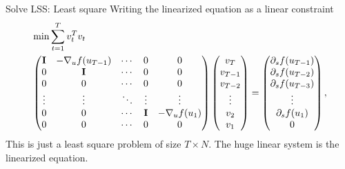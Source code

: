 \documentclass[NUS-Kajima workshop]{beamer}
\begin{document}
\begin{frame}{Solve LSS: Least square}
	Writing the linearized equation as a linear constraint
	\begin{equation}\label{equ:lss}
		\begin{aligned}
			& \min \sum_{t=1}^T v_t^T v_t \\
		&\begin{pmatrix}
			\mathbf{I} & -\nabla_u f(u_{T-1}) & \cdots & 0 & 0 \\
			0 & \mathbf{I} & \cdots & 0 & 0 \\
			0 & 0 & \cdots & 0 & 0 \\
			\vdots & \vdots & \ddots & \vdots & \vdots \\
			0 & 0 & \cdots & \mathbf{I} & -\nabla_u f(u_1)	\\
			0 & 0 & \cdots & 0 & 0
		\end{pmatrix}\begin{pmatrix}
			v_T \\ v_{T-1} \\ v_{T-2} \\ \vdots \\ v_2 \\ v_1
		\end{pmatrix} = \begin{pmatrix}
			\partial_s f(u_{T-1}) \\ \partial_s f(u_{T-2}) \\ \partial_s f(u_{T-3}) \\ \vdots \\ \partial_s f(u_{1}) \\ 0
		\end{pmatrix},
	\end{aligned}
	\end{equation}
	This is just a least square problem of size $T \times N$. The huge linear system is the linearized equation.
\end{frame}
\end{document}
